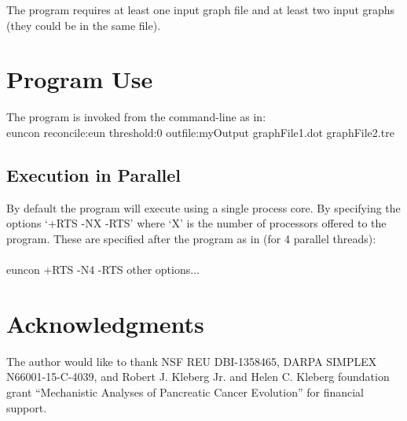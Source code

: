 \documentclass[11pt]{memoir}
\begin{document}
	The program requires at least one input graph file and at least two input graphs (they could be in the same file).

	
	\section{Program Use}
	The program is invoked from the command-line as in:\\
	euncon reconcile:eun threshold:0 outfile:myOutput graphFile1.dot graphFile2.tre\\
	
	
	\subsection{Execution in Parallel}
	By default the program will execute using a single process core.  By specifying the options `+RTS -NX -RTS' where `X' is the number of processors offered to the program. These are specified after the program as in (for 4 parallel threads):\\
	\\
	euncon +RTS -N4 -RTS other options...  \\
	
	\section*{Acknowledgments}
	The author would like to thank NSF REU DBI-1358465, DARPA SIMPLEX N66001-15-C-4039, and Robert J. Kleberg Jr. and Helen C. Kleberg foundation grant ``Mechanistic Analyses of Pancreatic Cancer Evolution'' for financial support.  
	
	
\end{document}
